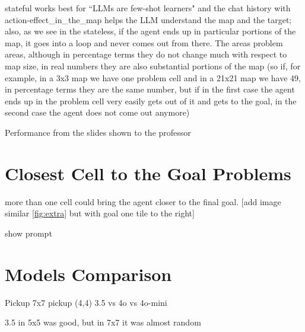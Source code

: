 stateful works best for ``LLMs are few-shot learners" and the chat history with
action-effect\_in\_the\_map helps the LLM understand the map and the target; also,
as we see in the stateless, if the agent ends up in particular portions of the map,
it goes into a loop and never comes out from there. The areas problem areas,
although in percentage terms they do not change much with respect to map size, in
real numbers they are also substantial portions of the map (so if, for example,
in a 3x3 map we have one problem cell and in a 21x21 map we have 49, in percentage
terms they are the same number, but if in the first case the agent ends up in
the problem cell very easily gets out of it and gets to the goal, in the second case
the agent does not come out anymore)

Performance from the slides shown to the professor

\section{Closest Cell to the Goal Problems}
\label{sec:closest_cell_to_the_goal_problems}

more than one cell could bring the agent closer to the final goal. [add image similar
\ref{fig:extra} but with goal one tile to the right]

show prompt

\section{Models Comparison}
\label{sec:models_comparison}

Pickup 7x7 pickup (4,4) 3.5 vs 4o vs 4o-mini

3.5 in 5x5 was good, but in 7x7 it was almost random